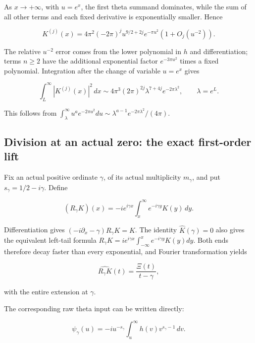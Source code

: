 As $x\to+\infty$, with $u=e^x$, the first theta summand dominates, while the sum of all other terms and each fixed derivative is exponentially smaller. Hence

\begin{equation}
K^{(j)}(x)=4\pi^2(-2\pi)^j
       u^{9/2+2j}e^{-\pi u^2}(1+O_j(u^{-2})).
 \label{eq:theta-hier-4}
\end{equation}

The relative $u^{-2}$ error comes from the lower polynomial in $h$ and differentiation; terms $n\ge2$ have the additional exponential factor $e^{-3\pi u^2}$ times a fixed polynomial. Integration after the change of variable $u=e^x$ gives

\begin{equation}
\int_L^\infty|K^{(j)}(x)|^2\,dx
  \sim4\pi^3(2\pi)^{2j}
         \lambda^{7+4j}e^{-2\pi\lambda^2},\qquad\lambda=e^L.
 \label{eq:theta-hier-5}
\end{equation}

This follows from
$\int_\lambda^\infty u^a e^{-2\pi u^2}du
\sim\lambda^{a-1}e^{-2\pi\lambda^2}/(4\pi)$.

\subsection{Division at an actual zero: the exact first-order lift}

Fix an actual positive ordinate $\gamma$, of its actual multiplicity $m_\gamma$, and put $s_\gamma=1/2-i\gamma$. Define

\begin{equation}
(R_\gamma K)(x)
   =-i e^{i\gamma x}\int_x^\infty e^{-i\gamma y}K(y)\,dy.
 \label{eq:theta-hier-6}
\end{equation}

Differentiation gives
$(-i\partial_x-\gamma)R_\gamma K=K$.
The identity $\widehat K(\gamma)=0$ also gives the equivalent left-tail formula
$R_\gamma K=i e^{i\gamma x}\int_{-\infty}^x e^{-i\gamma y}K(y)dy$.
Both ends therefore decay faster than every exponential, and Fourier transformation yields

\begin{equation}
\widehat{R_\gamma K}(t)=\frac{\Xi(t)}{t-\gamma},
 \label{eq:theta-hier-7}
\end{equation}

with the entire extension at $\gamma$.

The corresponding raw theta input can be written directly:

\begin{equation}
\psi_\gamma(u)
  =-i u^{-s_\gamma}\int_u^\infty h(v)v^{s_\gamma-1}\,dv.
 \label{eq:theta-hier-8}
\end{equation}


